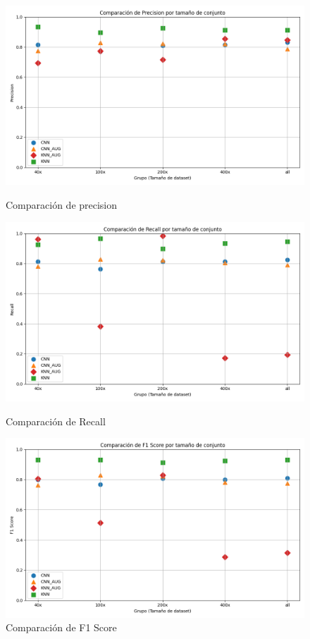 \documentclass[12pt]{article} %
\begin{document}
\begin{figure}[!ht]
\begin{minipage}[b]{0.45\textwidth}
        \includegraphics[width=\textwidth]{precision_comparativa_puntos.png}
        \caption{Comparación de precision}
        \label{fig:figura7}
    \end{minipage}
    \vspace{0.5cm}
    \begin{minipage}[b]{0.45\textwidth}
        \centering
        \includegraphics[width=\textwidth]{recall_comparativa_puntos.png}
        \caption{Comparación de Recall}
        \label{fig:figura8}
    \end{minipage}
    \hfill
    \begin{minipage}[b]{0.45\textwidth}
        \centering
        \includegraphics[width=\textwidth]{f1_score_comparativa_puntos.png}
        \caption{Comparación de F1 Score}
        \label{fig:figura9}
    \end{minipage}
\end{figure}
\end{document}
